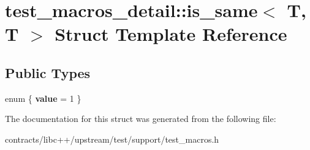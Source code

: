 \hypertarget{structtest__macros__detail_1_1is__same_3_01_t_00_01_t_01_4}{}\section{test\+\_\+macros\+\_\+detail\+:\+:is\+\_\+same$<$ T, T $>$ Struct Template Reference}
\label{structtest__macros__detail_1_1is__same_3_01_t_00_01_t_01_4}
\subsection*{Public Types}
\begin{DoxyCompactItemize}
\item 
\mbox{\label{structtest__macros__detail_1_1is__same_3_01_t_00_01_t_01_4_ac3ee2de11465fa08fff1054fe5832bda}} 
enum \{ {\bfseries value} = 1
 \}
\end{DoxyCompactItemize}


The documentation for this struct was generated from the following file\+:\begin{DoxyCompactItemize}
\item 
contracts/libc++/upstream/test/support/test\+\_\+macros.\+h\end{DoxyCompactItemize}
